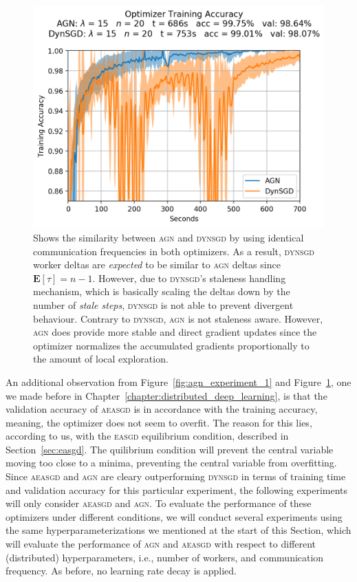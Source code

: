 \begin{figure}[H]
  \centering
  \includegraphics[width=.6\textwidth]{resources/images/agn_experiment_3}
  \caption{Shows the similarity between \textsc{agn} and \textsc{dynsgd} by using identical communication frequencies in both optimizers. As a result, \textsc{dynsgd} worker deltas are \emph{expected} to be similar to \textsc{agn} deltas since $\textbf{E}[\tau] = n - 1$. However, due to \textsc{dynsgd}'s staleness handling mechanism, which is basically scaling the deltas down by the number of \emph{stale steps}, \textsc{dynsgd} is not able to prevent divergent behaviour. Contrary to \textsc{dynsgd}, \textsc{agn} is not staleness aware. However, \textsc{agn} does provide more stable and direct gradient updates since the optimizer normalizes the accumulated gradients proportionally to the amount of local exploration.}
  \label{fig:agn_experiment_2}
\end{figure}

An additional observation from Figure~\ref{fig:agn_experiment_1} and Figure~\ref{fig:agn_experiment_2}, one we made before in Chapter~\ref{chapter:distributed_deep_learning}, is that the validation accuracy of \textsc{aeasgd} is in accordance with the training accuracy, meaning, the optimizer does not seem to overfit. The reason for this lies, according to us, with the \textsc{easgd} equilibrium condition, described in Section~\ref{sec:easgd}. The quilibrium condition will prevent the central variable moving too close to a minima, preventing the central variable from overfitting. Since \textsc{aeasgd} and \textsc{agn} are cleary outperforming \textsc{dynsgd} in terms of training time and validation accuracy for this particular experiment, the following experiments will only consider \textsc{aeasgd} and \textsc{agn}. To evaluate the performance of these optimizers under different conditions, we will conduct several experiments using the same hyperparameterizations we mentioned at the start of this Section, which will evaluate the performance of \textsc{agn} and \textsc{aeasgd} with respect to different (distributed) hyperparameters, i.e., number of workers, and communication frequency. As before, no learning rate decay is applied.\\

